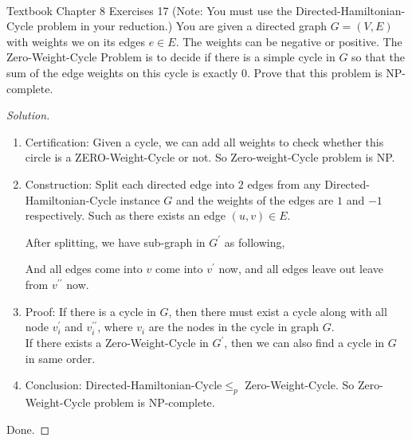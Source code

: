 \documentclass[a4paper]{article}
\newenvironment{solution}
  {\renewcommand\qedsymbol{$\blacksquare$}\begin{proof}[Solution]}
  {\end{proof}}
\begin{document}
\paragraph{}
Textbook Chapter 8 Exercises 17 (Note: You must use the Directed-Hamiltonian-Cycle problem in your
reduction.)
You are given a directed graph $G = (V, E)$ with weights we on its edges $e \in E$. The weights can be
negative or positive. The Zero-Weight-Cycle Problem is to decide if there is a simple cycle in $G$ so that the
sum of the edge weights on this cycle is exactly $0$. Prove that this problem is NP-complete.

\begin{solution}\
  \begin{enumerate}[(1)]
    \item Certification: Given a cycle, we can add all weights to check whether this circle is a ZERO-Weight-Cycle or not. So Zero-weight-Cycle problem is NP.
    \item Construction: Split each directed edge into $2$ edges from any Directed-Hamiltonian-Cycle instance $G$ and the weights of the edges are $1$ and $-1$ respectively. Such as there exists an edge $(u,v)\in E$.
    \begin{center}
    \end{center}
    After splitting, we have sub-graph in $G^{\prime}$ as following,
    \begin{center}
    \end{center}
    And all edges come into $v$ come into $v^{\prime}$  now, and all edges leave out leave from $v^{\prime\prime}$ now.
    \item Proof: If there is a cycle in $G$, then there must exist a cycle along with all node $v_{i}^{\prime}$ and $v_{i}^{\prime \prime}$, where $v_{i}$ are the nodes in the cycle in graph $G$.\\
    If there exists a Zero-Weight-Cycle in $G^{\prime}$, then we can also find a cycle in $G$ in same order.
    \item Conclusion: Directed-Hamiltonian-Cycle$\le_{p}$ Zero-Weight-Cycle. So Zero-Weight-Cycle problem is NP-complete.
  \end{enumerate}
  Done.
\end{solution}
\end{document}
